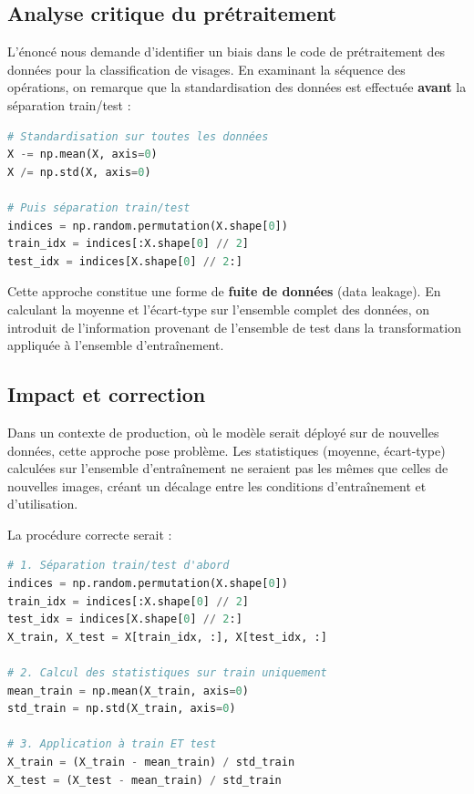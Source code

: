 \documentclass[11pt,a4paper]{article}
\begin{document}
\subsection{Analyse critique du prétraitement}

L'énoncé nous demande d'identifier un biais dans le code de prétraitement des données pour la classification de visages. En examinant la séquence des opérations, on remarque que la standardisation des données est effectuée \textbf{avant} la séparation train/test :

\begin{lstlisting}[language=Python]
# Standardisation sur toutes les données
X -= np.mean(X, axis=0)
X /= np.std(X, axis=0)

# Puis séparation train/test
indices = np.random.permutation(X.shape[0])
train_idx = indices[:X.shape[0] // 2]
test_idx = indices[X.shape[0] // 2:]
\end{lstlisting}

Cette approche constitue une forme de \textbf{fuite de données} (data leakage). En calculant la moyenne et l'écart-type sur l'ensemble complet des données, on introduit de l'information provenant de l'ensemble de test dans la transformation appliquée à l'ensemble d'entraînement.

\subsection{Impact et correction}

Dans un contexte de production, où le modèle serait déployé sur de nouvelles données, cette approche pose problème. Les statistiques (moyenne, écart-type) calculées sur l'ensemble d'entraînement ne seraient pas les mêmes que celles de nouvelles images, créant un décalage entre les conditions d'entraînement et d'utilisation.

La procédure correcte serait :

\begin{lstlisting}[language=Python]
# 1. Séparation train/test d'abord
indices = np.random.permutation(X.shape[0])
train_idx = indices[:X.shape[0] // 2]
test_idx = indices[X.shape[0] // 2:]
X_train, X_test = X[train_idx, :], X[test_idx, :]

# 2. Calcul des statistiques sur train uniquement
mean_train = np.mean(X_train, axis=0)
std_train = np.std(X_train, axis=0)

# 3. Application à train ET test
X_train = (X_train - mean_train) / std_train
X_test = (X_test - mean_train) / std_train
\end{lstlisting}
\end{document}
